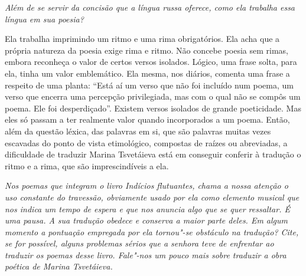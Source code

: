 \medskip

\emph{Além de se servir da concisão que a língua russa
oferece, como ela trabalha essa língua em sua poesia?}

Ela trabalha imprimindo um ritmo e uma rima obrigatórios.
Ela acha que a própria natureza da poesia exige rima e ritmo. Não
concebe poesia sem rimas, embora reconheça o valor de certos versos
isolados. Lógico, uma frase solta, para ela, tinha um valor emblemático.
Ela mesma, nos diários, comenta uma frase a respeito de uma planta:
``Está aí um verso que não foi incluído num poema, um verso que encerra
uma percepção privilegiada, mas com o qual não se compôs um poema. Ele
foi desperdiçado''. Existem versos isolados de grande poeticidade. Mas
eles só passam a ter realmente valor quando incorporados a um poema.
Então, além da questão léxica, das palavras em si, que são palavras
muitas vezes escavadas do ponto de vista etimológico, compostas de
raízes ou abreviadas, a dificuldade de traduzir Marina Tsvetáieva está
em conseguir conferir à tradução o ritmo e a rima, que são
imprescindíveis a ela.

\medskip

\emph{Nos poemas que integram o livro \emph{Indícios
flutuantes}, chama a nossa atenção o uso constante do travessão,
obviamente usado por ela como elemento musical que nos indica um tempo
de espera e que nos anuncia algo que se quer ressaltar. É uma pausa. A
sua tradução obedece e conserva a maior parte deles. Em algum momento a
pontuação empregada por ela tornou"-se obstáculo na tradução? Cite, se
for possível, alguns problemas sérios que a senhora teve de enfrentar ao
traduzir os poemas desse livro. Fale"-nos um pouco mais sobre traduzir a
obra poética de Marina Tsvetáieva.}

